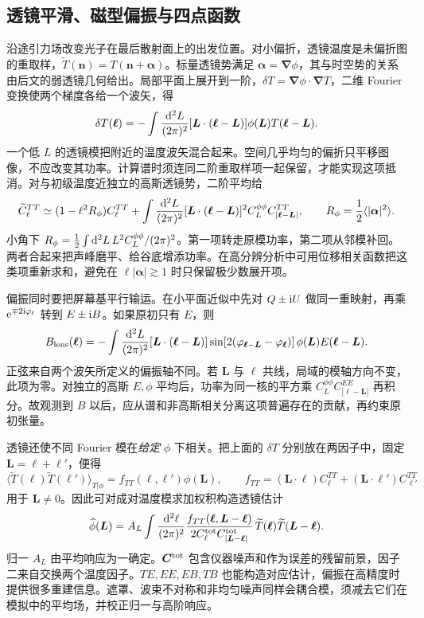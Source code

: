 \subsection{透镜平滑、磁型偏振与四点函数}

沿途引力场改变光子在最后散射面上的出发位置。对小偏折，透镜温度是未偏折图的重取样，$\widetilde T(\bm n)=T(\bm n+\bm\alpha)$。标量透镜势满足 $\bm\alpha=\bm\nabla\phi$，其与时空势的关系由后文的弱透镜几何给出。局部平面上展开到一阶，$\delta T=\bm\nabla\phi\cdot\bm\nabla T$，二维 Fourier 变换使两个梯度各给一个波矢，得
\[
 \delta T(\bm\ell)=-\int\frac{\dd^2L}{(2\pi)^2}
       [\bm L\cdot(\bm\ell-\bm L)]\phi(\bm L)T(\bm\ell-\bm L).
\]
一个低 $L$ 的透镜模把附近的温度波矢混合起来。空间几乎均匀的偏折只平移图像，不应改变其功率。计算谱时须连同二阶重取样项一起保留，才能实现这项抵消。对与初级温度近独立的高斯透镜势，二阶平均给
\[
 \widetilde C_\ell^{TT}\simeq
 (1-\ell^2R_\phi)C_\ell^{TT}
 +\int\frac{\dd^2L}{(2\pi)^2}
 [\bm L\cdot(\bm\ell-\bm L)]^2
           C_L^{\phi\phi}C_{|\bm\ell-\bm L|}^{TT},
 \qquad
 R_\phi=\frac12\langle|\bm\alpha|^2\rangle .
\]
小角下 $R_\phi=\tfrac12\int\dd^2L\,L^2C_L^{\phi\phi}/(2\pi)^2$。第一项转走原模功率，第二项从邻模补回。两者合起来把声峰磨平、给谷底增添功率。在高分辨分析中可用位移相关函数把这类项重新求和，避免在 $\ell|\bm\alpha|\gtrsim1$ 时只保留极少数展开项。

偏振同时要把屏幕基平行输运。在小平面近似中先对 $Q\pm\mathrm{i} U$ 做同一重映射，再乘 $\mathrm{e}^{\mp2\mathrm{i}\varphi_\ell}$ 转到 $E\pm\mathrm{i} B$。如果原初只有 $E$，则
\begin{equation}\label{eq:cl-lensingB}
 B_{\rm lens}(\bm\ell)=-
   \int\frac{\dd^2L}{(2\pi)^2}
 [\bm L\cdot(\bm\ell-\bm L)]
 \sin[2(\varphi_{\bm\ell-\bm L}-\varphi_{\bm\ell})]\,
       \phi(\bm L)E(\bm\ell-\bm L).
\end{equation}
正弦来自两个波矢所定义的偏振轴不同。若 $\bm L$ 与 $\bm\ell$ 共线，局域的模轴方向不变，此项为零。对独立的高斯 $E,\phi$ 平均后，功率为同一核的平方乘 $C_L^{\phi\phi}C_{|\bm\ell-\bm L|}^{EE}$ 再积分。故观测到 $B$ 以后，应从谱和非高斯相关分离这项普遍存在的贡献，再约束原初张量。

透镜还使不同 Fourier 模在\emph{给定} $\phi$ 下相关。把上面的 $\delta T$ 分别放在两因子中，固定 $\bm L=\bm\ell+\bm\ell'$，便得
\[
 \langle\widetilde T(\bm\ell)\widetilde T(\bm\ell')\rangle_{T|\phi}
  =f_{TT}(\bm\ell,\bm\ell')\phi(\bm L),\qquad
 f_{TT}=(\bm L\cdot\bm\ell)C_\ell^{TT}
                  +(\bm L\cdot\bm\ell')C_{\ell'}^{TT}
\]
用于 $\bm L\ne0$。因此可对成对温度模求加权积构造透镜估计
\[
 \widehat\phi(\bm L)=A_L\int\frac{\dd^2\ell}{(2\pi)^2}
 \frac{f_{TT}(\bm\ell,\bm L-\bm\ell)}
   {2C_\ell^{\rm tot}C_{|\bm L-\bm\ell|}^{\rm tot}}\,
     \widetilde T(\bm\ell)\widetilde T(\bm L-\bm\ell).
\]
归一 $A_L$ 由平均响应为一确定。$\bm C^{\rm tot}$ 包含仪器噪声和作为误差的残留前景，因子二来自交换两个温度因子。$TE,EE,EB,TB$ 也能构造对应估计，偏振在高精度时提供很多重建信息。遮罩、波束不对称和非均匀噪声同样会耦合模，须减去它们在模拟中的平均场，并校正归一与高阶响应。

